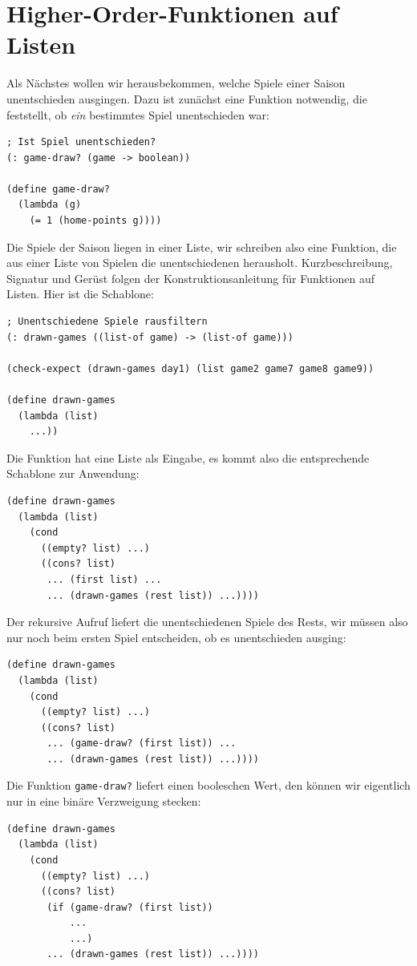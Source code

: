 \section{Higher-Order-Funktionen auf Listen}

%
Als Nächstes wollen wir herausbekommen, welche Spiele einer Saison
unentschieden ausgingen.  Dazu ist zunächst eine Funktion notwendig,
die feststellt, ob \emph{ein} bestimmtes Spiel unentschieden war:
%
\begin{lstlisting}
; Ist Spiel unentschieden?
(: game-draw? (game -> boolean))

(define game-draw?
  (lambda (g)
    (= 1 (home-points g))))
\end{lstlisting}
%
Die Spiele der Saison liegen in einer Liste, wir schreiben also eine
Funktion, die aus einer Liste von Spielen die
unentschiedenen herausholt.  Kurzbeschreibung, Signatur und Gerüst
folgen der Konstruktionsanleitung für Funktionen auf Listen.
Hier ist die Schablone:
%
\begin{lstlisting}
; Unentschiedene Spiele rausfiltern
(: drawn-games ((list-of game) -> (list-of game)))

(check-expect (drawn-games day1) (list game2 game7 game8 game9))

(define drawn-games
  (lambda (list)
    ...))
\end{lstlisting}
%
Die Funktion hat eine Liste als Eingabe, es kommt also die
entsprechende Schablone zur Anwendung:
%
\begin{lstlisting}
(define drawn-games
  (lambda (list)
    (cond
      ((empty? list) ...)
      ((cons? list)
       ... (first list) ...
       ... (drawn-games (rest list)) ...))))
\end{lstlisting}
%
Der rekursive Aufruf liefert die unentschiedenen Spiele des Rests, wir
müssen also nur noch beim ersten Spiel entscheiden, ob es
unentschieden ausging:
%
\begin{lstlisting}
(define drawn-games
  (lambda (list)
    (cond
      ((empty? list) ...)
      ((cons? list)
       ... (game-draw? (first list)) ...
       ... (drawn-games (rest list)) ...))))
\end{lstlisting}
%
Die Funktion \lstinline{game-draw?} liefert einen booleschen Wert,
den können wir eigentlich nur in eine binäre Verzweigung stecken:
%
\begin{lstlisting}
(define drawn-games
  (lambda (list)
    (cond
      ((empty? list) ...)
      ((cons? list)
       (if (game-draw? (first list))
           ...
           ...)
       ... (drawn-games (rest list)) ...))))
\end{lstlisting}
